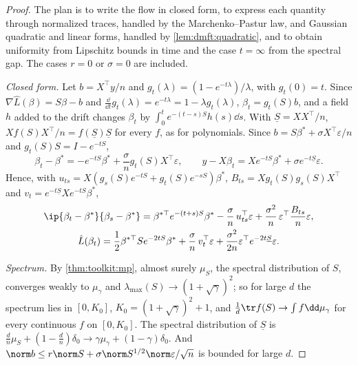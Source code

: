 \begin{refsection}
\begin{proof}
The plan is to write the flow in closed form, to express each quantity through normalized traces, handled by the Marchenko--Pastur law, and Gaussian quadratic and linear forms, handled by \cref{lem:dmft:quadratic}, and to obtain uniformity from Lipschitz bounds in time and the case $t=\infty$ from the spectral gap. The cases $r=0$ or $\sigma=0$ are included.

\emph{Closed form.} Let $b=X^\top y/n$ and $g_t(\lambda)=(1-e^{-t\lambda})/\lambda$, with $g_t(0)=t$. Since $\nabla\hat L(\beta)=S\beta-b$ and $\frac{\dd}{\dd t}g_t(\lambda)=e^{-t\lambda}=1-\lambda g_t(\lambda)$, $\beta_t=g_t(S)b$, and a field $h$ added to the drift changes $\beta_t$ by $\int_0^te^{-(t-s)S}h(s)\dd s$. With $\underline S=XX^\top/n$, $Xf(S)X^\top/n=f(\underline S)\underline S$ for every $f$, as for polynomials. Since $b=S\beta^*+\sigma X^\top\varepsilon/n$ and $g_t(S)S=I-e^{-tS}$,
\[
\beta_t-\beta^*=-e^{-tS}\beta^*+\frac\sigma ng_t(S)X^\top\varepsilon,\qquad y-X\beta_t=Xe^{-tS}\beta^*+\sigma e^{-t\underline S}\varepsilon.
\]
Hence, with $u_{ts}=X(g_s(S)e^{-tS}+g_t(S)e^{-sS})\beta^*$, $B_{ts}=Xg_t(S)g_s(S)X^\top$ and $v_t=e^{-t\underline S}Xe^{-tS}\beta^*$,
\begin{gather*}
\ip{\beta_t-\beta^*}{\beta_s-\beta^*}=\beta^{*\top}e^{-(t+s)S}\beta^*-\frac\sigma n\,u_{ts}^\top\varepsilon+\frac{\sigma^2}n\,\varepsilon^\top\frac{B_{ts}}n\varepsilon,\\
\hat L(\beta_t)=\frac12\beta^{*\top}Se^{-2tS}\beta^*+\frac\sigma n\,v_t^\top\varepsilon+\frac{\sigma^2}{2n}\varepsilon^\top e^{-2t\underline S}\varepsilon.
\end{gather*}

\emph{Spectrum.} By \cref{thm:toolkit:mp}, almost surely $\mu_S$, the spectral distribution of $S$, converges weakly to $\mu_\gamma$ and $\lambda_{\max}(S)\to(1+\sqrt\gamma)^2$; so for large $d$ the spectrum lies in $[0,K_0]$, $K_0=(1+\sqrt\gamma)^2+1$, and $\frac1d\tr f(S)\to\int f\dd\mu_\gamma$ for every continuous $f$ on $[0,K_0]$. The spectral distribution of $\underline S$ is $\frac dn\mu_S+(1-\frac dn)\delta_0\to\gamma\mu_\gamma+(1-\gamma)\delta_0$. And $\norm b\le r\norm S+\sigma\norm S^{1/2}\norm\varepsilon/\sqrt n$ is bounded for large $d$.


\end{proof}
\end{refsection}

